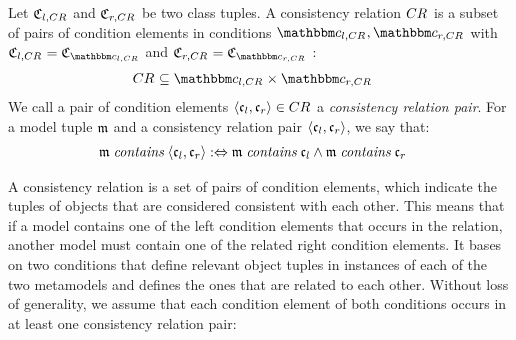 \begin{definition}
\label{def:consistencyrelation}
    Let $\classtuple{C}{l,\consistencyrelation{CR}{}}$ and $\classtuple{C}{r,\consistencyrelation{CR}{}}$ be two class tuples.
    A consistency relation $\consistencyrelation{CR}{}$ is a subset of pairs of condition elements in conditions $\condition{c}{l,\consistencyrelation{CR}{}}, \condition{c}{r,\consistencyrelation{CR}{}}$ with
    $\classtuple{C}{l,\consistencyrelation{CR}{}} = \classtuple{C}{\condition{c}{l,\consistencyrelation{CR}{}}}$ and $\classtuple{C}{r,\consistencyrelation{CR}{}} = \classtuple{C}{\condition{c}{r,\consistencyrelation{CR}{}}}$ :
    \begin{align*}
        & 
        \consistencyrelation{CR}{} \subseteq \condition{c}{l,\consistencyrelation{CR}{}} \times \condition{c}{r,\consistencyrelation{CR}{}}
    \end{align*}
    We call a pair of condition elements $\tupled{\conditionelement{c}{l}, \conditionelement{c}{r}} \in \consistencyrelation{CR}{}$ a \emph{consistency relation pair}. 
    For a model tuple $\modeltuple{m}$ and a consistency relation pair $\tupled{\conditionelement{c}{l}, \conditionelement{c}{r}}$, we say that:
    \begin{align*}
        & 
        \modeltuple{m} \containsmath \tupled{\conditionelement{c}{l}, \conditionelement{c}{r}} \equivalentperdefinition \modeltuple{m} \containsmath \conditionelement{c}{l} \land \modeltuple{m} \containsmath \conditionelement{c}{r}
    \end{align*}
\end{definition}

A consistency relation is a set of pairs of condition elements, which indicate the tuples of objects that are considered consistent with each other. 
This means that if a model contains one of the left condition elements that occurs in the relation, another model must contain one of the related right condition elements.
It bases on two conditions that define relevant object tuples in instances of each of the two metamodels and defines the ones that are related to each other.
Without loss of generality, we assume that each condition element of both conditions occurs in at least one consistency relation pair:
%

